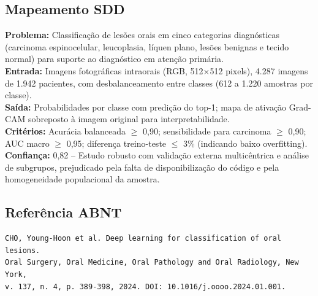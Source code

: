 \subsection{Mapeamento SDD}
\textbf{Problema:} Classificação de lesões orais em cinco categorias
diagnósticas (carcinoma espinocelular, leucoplasia, líquen plano, lesões
benignas e tecido normal) para suporte ao diagnóstico em atenção primária. \\
\textbf{Entrada:} Imagens fotográficas intraorais (RGB, 512$\times$512
pixels), 4.287 imagens de 1.942 pacientes, com desbalanceamento entre classes
(612 a 1.220 amostras por classe). \\
\textbf{Saída:} Probabilidades por classe com predição do top-1; mapa de
ativação Grad-CAM sobreposto à imagem original para interpretabilidade. \\
\textbf{Critérios:} Acurácia balanceada $\geq$ 0,90; sensibilidade para
carcinoma $\geq$ 0,90; AUC macro $\geq$ 0,95; diferença treino-teste
$\leq$ 3\% (indicando baixo overfitting). \\
\textbf{Confiança:} 0,82 -- Estudo robusto com validação externa
multicêntrica e análise de subgrupos, prejudicado pela falta de
disponibilização do código e pela homogeneidade populacional da amostra.

\subsection{Referência ABNT}
\begin{verbatim}
CHO, Young-Hoon et al. Deep learning for classification of oral lesions.
Oral Surgery, Oral Medicine, Oral Pathology and Oral Radiology, New York,
v. 137, n. 4, p. 389-398, 2024. DOI: 10.1016/j.oooo.2024.01.001.
\end{verbatim}
\endinput
